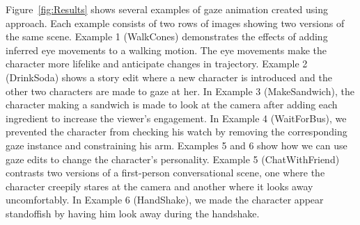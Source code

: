 Figure~\ref{fig:Results} shows several examples of gaze animation created using approach. Each example consists of two rows of images showing two versions of the same scene. Example 1 (WalkCones) demonstrates the effects of adding inferred eye movements to a walking motion. The eye movements make the character more lifelike and anticipate changes in trajectory. Example 2 (DrinkSoda) shows a story edit where a new character is introduced and the other two characters are made to gaze at her. In Example 3 (MakeSandwich), the character making a sandwich is made to look at the camera after adding each ingredient to increase the viewer's engagement. In Example 4 (WaitForBus), we prevented the character from checking his watch by removing the corresponding gaze instance and constraining his arm. Examples 5 and 6 show how we can use gaze edits to change the character's personality. Example 5 (ChatWithFriend) contrasts two versions of a first-person conversational scene, one where the character creepily stares at the camera and another where it looks away uncomfortably. In Example 6 (HandShake), we made the character appear standoffish by having him look away during the handshake. 